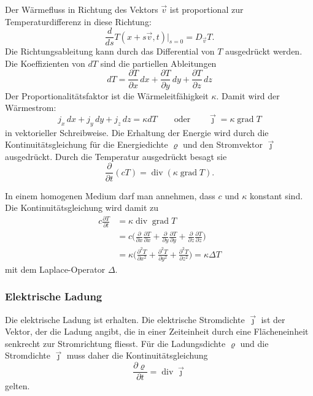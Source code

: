 Der Wärmefluss in Richtung des Vektors $\vec{v}$ ist proportional
%
zur Temperaturdifferenz in diese Richtung:
\[
\frac{d}{ds}
T(x+s\vec{v},t)\bigg|_{s=0}
=
D_{\vec{v}} T.
\]
Die Richtungsableitung kann durch das Differential von $T$
ausgedrückt werden.
Die Koeffizienten von $dT$ sind die partiellen Ableitungen
\[
dT
=
\frac{\partial T}{\partial x}\,dx
+
\frac{\partial T}{\partial y}\,dy
+
\frac{\partial T}{\partial z}\,dz
\]
Der Proportionalitätsfaktor ist die Wärmeleitfähigkeit $\kappa$.
Damit wird der Wärmestrom:
\[
j_x\,dx
+
j_y\,dy
+
j_z\,dz
=
\kappa
dT
\qquad\text{oder}\qquad
\vec{\jmath}
=
\kappa
\operatorname{grad} T
\]
in vektorieller Schreibweise.
Die Erhaltung der Energie wird durch die Kontinuitätsgleichung
für die Energiedichte $\varrho$ und den Stromvektor $\vec{\jmath}$
ausgedrückt.
Durch die Temperatur ausgedrückt besagt sie
\[
\frac{\partial }{\partial t}
(cT)
=
\operatorname{div}(\kappa\operatorname{grad}T).
\]

In einem homogenen Medium darf man annehmen, dass $c$ und $\kappa$ konstant
sind.
Die Kontinuitätsgleichung wird damit zu
\begin{align*}
c\frac{\partial T}{\partial t}
&=
\kappa
\operatorname{div}\operatorname{grad}T
\\
&=
c
\biggl(
\frac{\partial}{\partial x}
\frac{\partial T}{\partial x}
+
\frac{\partial}{\partial y}
\frac{\partial T}{\partial y}
+
\frac{\partial}{\partial z}
\frac{\partial T}{\partial z}
\biggr)
\\
&=
\kappa
\biggl(
\frac{\partial^2 T}{\partial x^2}
+
\frac{\partial^2 T}{\partial y^2}
+
\frac{\partial^2 T}{\partial z^2}
\biggr)
=
\kappa \Delta T
\end{align*}
mit dem Laplace-Operator $\Delta$.

%
%
\subsubsection{Elektrische Ladung}
Die elektrische Ladung ist erhalten.
%
%
Die elektrische Stromdichte $\vec{\jmath}$ ist der Vektor, der die Ladung
%
angibt, die in einer Zeiteinheit durch eine Flächeneinheit senkrecht zur
Stromrichtung fliesst.
Für die Ladungsdichte $\varrho$ und die Stromdichte $\vec{\jmath}$
muss daher die Kontinuitätsgleichung
\[
\frac{\partial\varrho}{\partial t}
=
\operatorname{div} \vec{\jmath}
\]
gelten.

%
%
